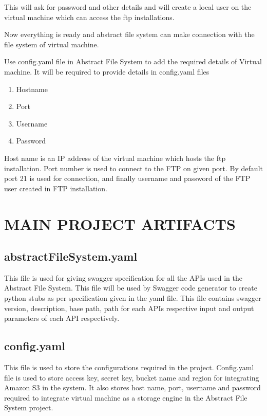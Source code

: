 This will ask for password and other details and will create a local user on 
the virtual machine which can access the ftp installations.

Now everything is ready and abstract file system can make connection with the 
file system of virtual machine.





Use config.yaml file in Abstract File System to add the required details of 
Virtual machine. 
It will be required to provide details in config.yaml files
\begin{enumerate}
    \item Hostname
    \item Port
    \item Username
    \item Password
\end{enumerate}


Host name is an IP address of the virtual machine which hosts the ftp 
installation. Port number is used to connect to the FTP on given port. By 
default port 21 is used for connection, and finally username and password of 
the FTP user created in FTP installation.





\section{MAIN PROJECT ARTIFACTS}
\subsection{abstractFileSystem.yaml}
This file is used for giving swagger specification for all the APIs used in 
the Abstract File System. This file will be used by Swagger code generator to 
create python stubs as per specification given in the yaml file.
This file contains swagger version, description, base path, path for each APIs 
respective input and output parameters of each API respectively.

\subsection{config.yaml}
This file is used to store the configurations required in the project. 
Config.yaml file is used to store access key, secret key, bucket name and 
region for integrating Amazon S3 in the system. It also stores host name, 
port, username and password required to integrate virtual machine as a storage 
engine in the Abstract File System project.

